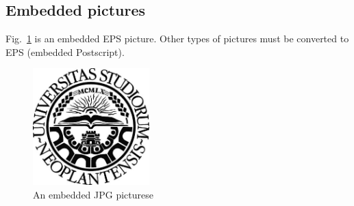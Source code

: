 \documentclass[a4paper,11pt]{article}
\begin{document}

\subsection{Embedded pictures}\label{sec:pictures}

Fig.~\ref{fig:mypicture1} is an embedded EPS picture. Other types of pictures must be converted to EPS (embedded Postscript).

\begin{figure}[t]
  \begin{center}
    \includegraphics[width=0.4\textwidth,height=0.4\textheight,keepaspectratio]{NoviSadLogoGray.jpg}
    \caption{An embedded JPG picturese }
    \label{fig:mypicture1}
  \end{center}
\end{figure}


\clearpage
%

 
%
\end{document}
